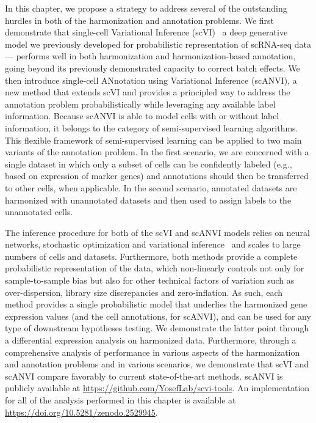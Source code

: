 In this chapter, we propose a strategy to address several of the outstanding hurdles in both of the harmonization and annotation problems. We first demonstrate that single-cell Variational Inference (scVI)~\cite{scvi} a deep generative model we previously developed for probabilistic representation of scRNA-seq data --- performs well in both harmonization and harmonization-based annotation, going beyond its previously demonstrated capacity to correct batch effects. We then introduce single-cell ANnotation using Variational Inference (scANVI), a new method that extends scVI and provides a principled way to address the annotation problem probabilistically while leveraging any available label information. Because scANVI is able to model cells with or without label information, it belongs to the category of semi-supervised learning algorithms. This flexible framework of semi-supervised learning can be applied to two main variants of the annotation problem. In the first scenario, we are concerned with a single dataset in which only a subset of cells can be confidently labeled (e.g., based on expression of marker genes) and annotations should then be transferred to other cells, when applicable. In the second scenario, annotated datasets are harmonized with unannotated datasets and then used to assign labels to the unannotated cells.

The inference procedure for both of the scVI and scANVI models relies on neural networks, stochastic optimization and variational inference~\cite{aevb,VFAE} and scales to large numbers of cells and datasets. Furthermore, both methods provide a complete probabilistic representation of the data, which non-linearly controls not only for sample-to-sample bias but also for other technical factors of variation such as over-dispersion, library size discrepancies and zero-inflation. As such, each method provides a single probabilistic model that underlies the harmonized gene expression values (and the cell annotations, for scANVI), and can be used for any type of downstream hypotheses testing. We demonstrate the latter point through a differential expression analysis on harmonized data. Furthermore, through a comprehensive analysis of performance in various aspects of the harmonization and annotation problems and in various scenarios, we demonstrate that scVI and scANVI compare favorably to current state-of-the-art methods. scANVI is publicly available at \url{https://github.com/YosefLab/scvi-tools}. An implementation for all of the analysis performed in this chapter is available at
\url{https://doi.org/10.5281/zenodo.2529945}.




